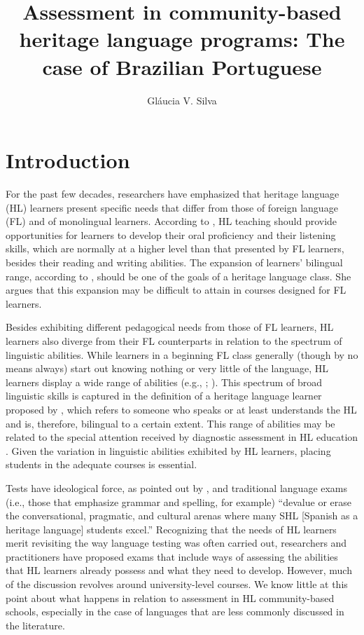 \documentclass[output=paper]{langscibook}
\author{Gláucia V. Silva\affiliation{University of Massachusetts-Dartmouth}}
\title[Assessment in community-based heritage language programs]
      {Assessment in community-based heritage language programs: The case of Brazilian Portuguese}
\begin{document}
\AffiliationsWithoutIndexing{}
\maketitle



\section{Introduction}

  For the past few decades, researchers have emphasized that heritage language (HL) learners present specific needs that differ from those of foreign language (FL) and of monolingual learners. According to \citet{Valdés1981}, HL teaching should provide opportunities for learners to develop their oral proficiency and their listening skills, which are normally at a higher level than that presented by FL learners, besides their reading and writing abilities. The expansion of learners’ bilingual range, according to \citet{Valdés1997}, should be one of the goals of a heritage language class. She argues that this expansion may be difficult to attain in courses designed for FL learners.

  Besides exhibiting different pedagogical needs from those of FL learners, HL learners also diverge from their FL counterparts in relation to the spectrum of linguistic abilities. While learners in a beginning FL class generally (though by no means always) start out knowing nothing or very little of the language, HL learners display a wide range of abilities (e.g., \citealt{WangGreen2001}; \citealt{BeaudriePotowski2014}). This spectrum of broad linguistic skills is captured in the definition of a heritage language learner proposed by \citet[38]{Valdés2001}, which refers to someone who speaks or at least understands the HL and is, therefore, bilingual to a certain extent. This range of abilities may be related to the special attention received by diagnostic assessment in HL education \citep{Fairclough2012b}. Given the variation in linguistic abilities exhibited by HL learners, placing students in the adequate courses is essential.

  Tests have ideological force, as pointed out by \citet[54]{Leeman2012}, and traditional language exams (i.e., those that emphasize grammar and spelling, for example) “devalue or erase the conversational, pragmatic, and cultural arenas where many SHL [Spanish as a heritage language] students excel.” Recognizing that the needs of HL learners merit revisiting the way language testing was often carried out, researchers and practitioners have proposed exams that include ways of assessing the abilities that HL learners already possess and what they need to develop. However, much of the discussion revolves around university-level courses. We know little at this point about what happens in relation to assessment in HL community-based schools, especially in the case of languages that are less commonly discussed in the literature.
\end{document}

